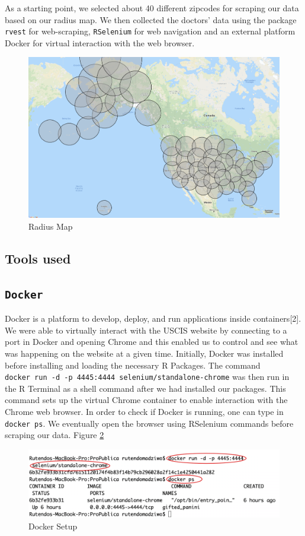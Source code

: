 \documentclass[10pt,letterpaper]{article}
\begin{document}
As a starting point, we selected about 40 different zipcodes for
scraping our data based on our radius map. We then collected the
doctors' data using the package \texttt{rvest} for web-scraping,
\texttt{RSelenium} for web navigation and an external platform Docker
for virtual interaction with the web browser.

\begin{figure}
\includegraphics[width=0.5\linewidth]{RadiusMap} \caption{Radius Map}\label{fig:unnamed-chunk-1}
\end{figure}

\subsection{Tools used}\label{tools-used}

\subsection{\texorpdfstring{\texttt{Docker}}{Docker}}\label{docker}

Docker is a platform to develop, deploy, and run applications inside
containers{[}2{]}. We were able to virtually interact with the USCIS
website by connecting to a port in Docker and opening Chrome and this
enabled us to control and see what was happening on the website at a
given time. Initially, Docker was installed before installing and
loading the necessary R Packages. The command
\texttt{docker\ run\ -d\ -p\ 4445:4444\ selenium/standalone-chrome} was
then run in the R Terminal as a shell command after we had installed our
packages. This command sets up the virtual Chrome container to enable
interaction with the Chrome web browser. In order to check if Docker is
running, one can type in \texttt{docker\ ps}. We eventually open the
browser using RSelenium commands before scraping our data. Figure
\ref{fig:Fig2}

\begin{figure}
\includegraphics[width=0.5\linewidth]{docker_start} \caption{Docker Setup}\label{fig:Fig2}
\end{figure}
\end{document}

